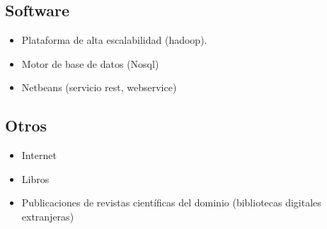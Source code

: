 \documentclass[12pt,letterpaper]{article}
\begin{document}
\subsection{Software}
  \begin{itemize}
    \item Plataforma de alta escalabilidad (hadoop).
    \item Motor de base de datos (Nosql)
    \item Netbeans (servicio rest, webservice)
  \end{itemize}

\subsection{Otros}
  \begin{itemize}
    \item Internet 
    \item Libros  
    \item Publicaciones de revistas cient\'ificas del dominio 
    (bibliotecas digitales extranjeras)  
  \end{itemize}

\newpage
\clearpage



\end{document}
